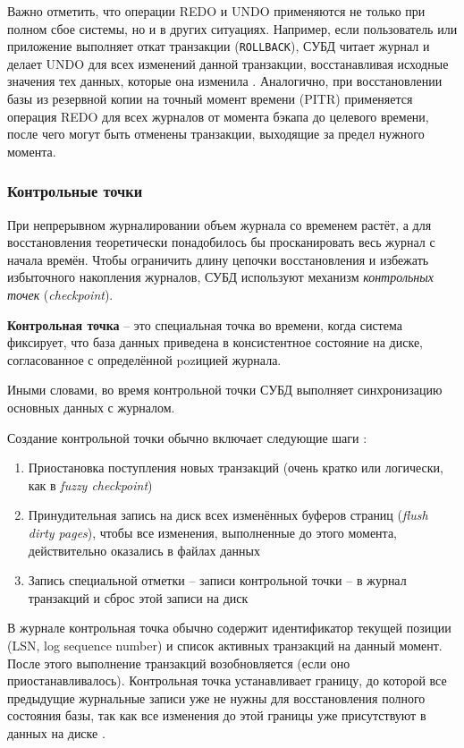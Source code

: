  Важно отметить, что операции REDO и UNDO применяются не только при полном сбое системы, но и в других ситуациях. Например, если пользователь или приложение выполняет откат транзакции (\texttt{ROLLBACK}), СУБД читает журнал и делает UNDO для всех изменений данной транзакции, восстанавливая исходные значения тех данных, которые она изменила \autocite{MicrosoftLearnSQLserverTransLog}. Аналогично, при восстановлении базы из резервной копии на точный момент времени (PITR) применяется операция REDO для всех журналов от момента бэкапа до целевого времени, после чего могут быть отменены транзакции, выходящие за предел нужного момента.

\subsubsection{Контрольные точки} 
 При непрерывном журналировании объем журнала со временем растёт, а для восстановления теоретически понадобилось бы просканировать весь журнал с начала времён. Чтобы ограничить длину цепочки восстановления и избежать избыточного накопления журналов, СУБД используют механизм \textit{контрольных точек} (\textit{checkpoint}). 
 \begin{grayquote}
    \textbf{Контрольная точка} – это специальная точка во времени, когда система фиксирует, что база данных приведена в консистентное состояние на диске, согласованное с определённой pozицией журнала. 
 \end{grayquote}
 Иными словами, во время контрольной точки СУБД выполняет синхронизацию основных данных с журналом. 
 
 Создание контрольной точки обычно включает следующие шаги \autocite{ElmasriNavathe}: 
 \begin{enumerate}
    \item Приостановка поступления новых транзакций (очень кратко или логически, как в \textit{fuzzy checkpoint})
    \item Принудительная запись на диск всех изменённых буферов страниц (\textit{flush dirty pages}), чтобы все изменения, выполненные до этого момента, действительно оказались в файлах данных
    \item Запись специальной отметки – записи контрольной точки – в журнал транзакций и сброс этой записи на диск
 \end{enumerate}
 
 В журнале контрольная точка обычно содержит идентификатор текущей позиции (LSN, log sequence number) и список активных транзакций на данный момент. После этого выполнение транзакций возобновляется (если оно приостанавливалось). Контрольная точка устанавливает границу, до которой все предыдущие журнальные записи уже не нужны для восстановления полного состояния базы, так как все изменения до этой границы уже присутствуют в данных на диске \autocite{ElmasriNavathe}. 
 
